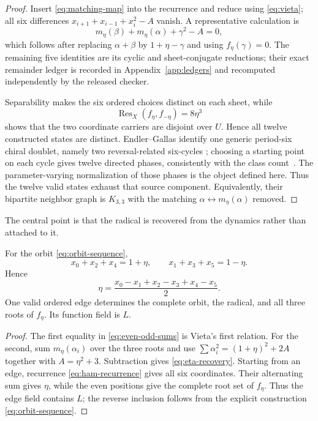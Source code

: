 \begin{proof}
Insert \eqref{eq:matching-map} into the recurrence and reduce using
\eqref{eq:vieta}; all six differences
$x_{i+1}+x_{i-1}+x_i^2-A$ vanish.  A representative calculation is
\[
 m_\eta(\beta)+m_\eta(\alpha)+\gamma^2-A=0,
\]
which follows after replacing $\alpha+\beta$ by $1+\eta-\gamma$ and using
$f_\eta(\gamma)=0$.  The remaining five identities are its cyclic and
sheet-conjugate reductions; their exact remainder ledger is recorded in
Appendix~\ref{app:ledgers} and recomputed independently by the released
checker.

Separability makes the six ordered choices distinct on each sheet, while
\begin{equation}\label{eq:sheet-resultant}
 \operatorname{Res}_X(f_\eta,f_{-\eta})=8\eta^3
\end{equation}
shows that the two coordinate carriers are disjoint over $U$.  Hence all
twelve constructed states are distinct.  Endler--Gallas identify one
generic period-six chiral doublet, namely two reversal-related six-cycles
\cite[p.~3, discussion following Eq.~(15)]{endlergallas2006chiral}; choosing
a starting point on each cycle gives twelve directed phases, consistently
with the class count~\cite[Eqs.~(2)--(7) and Table~1]{gallas2007}.  The
parameter-varying normalization of those phases is the object defined here.
Thus the twelve valid states exhaust that source component.  Equivalently,
their bipartite neighbor graph is $K_{3,3}$ with the matching
$\alpha\leftrightarrow m_\eta(\alpha)$ removed.
\end{proof}

The central point is that the radical is recovered from the dynamics rather
than attached to it.

\begin{proposition}\label{prop:recovery}
For the orbit \eqref{eq:orbit-sequence},
\begin{equation}\label{eq:even-odd-sums}
 x_0+x_2+x_4=1+\eta,
 \qquad
 x_1+x_3+x_5=1-\eta.
\end{equation}
Hence
\begin{equation}\label{eq:eta-recovery}
 \boxed{
 \eta=\frac{x_0-x_1+x_2-x_3+x_4-x_5}{2}.}
\end{equation}
One valid ordered edge determines the complete orbit, the radical, and all
three roots of $f_\eta$.  Its function field is $L$.
\end{proposition}

\begin{proof}
The first equality in \eqref{eq:even-odd-sums} is Vieta's first relation.
For the second, sum $m_\eta(\alpha_i)$ over the three roots and use
$\sum\alpha_i^2=(1+\eta)^2+2A$ together with $A=\eta^2+3$.  Subtraction
gives \eqref{eq:eta-recovery}.  Starting from an edge, recurrence
\eqref{eq:ham-recurrence} gives all six coordinates.  Their alternating sum
gives $\eta$, while the even positions give the complete root set of
$f_\eta$.  Thus the edge field contains $L$; the reverse inclusion follows
from the explicit construction \eqref{eq:orbit-sequence}.
\end{proof}


